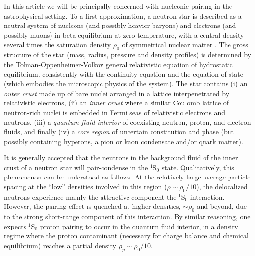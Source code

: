 In this article we will be principally concerned with nucleonic pairing
in the astrophysical setting.  To a first approximation, a neutron star 
is described as a neutral system of nucleons (and possibly heavier baryons) 
and electrons (and possibly muons) in beta equilibrium at zero temperature, 
with a central density several times the saturation density $\rho_0$ 
of symmetrical nuclear matter \cite{pethick,shapiro,lamb,fiks,alparlives}. 
The gross structure of the star (mass, radius, pressure and density 
profiles) is determined by the Tolman-Oppenheimer-Volkov general 
relativistic equation of hydrostatic equilibrium, consistently with 
the continuity equation and the equation of state (which embodies the 
microscopic physics of the system).  The star contains (i) an {\it outer 
crust} made up of bare nuclei arranged in a lattice interpenetrated 
by relativistic electrons, (ii) an {\it inner crust} where a similar 
Coulomb lattice of neutron-rich nuclei is embedded in Fermi seas of 
relativistic electrons and neutrons, (iii) a {\it quantum fluid interior} 
of coexisting neutron, proton, and electron fluids, and finally 
(iv) a {\it core region} of uncertain constitution and phase (but 
possibly containing hyperons, a pion or kaon condensate and/or quark matter).

It is generally accepted \cite{ccdk,ttr} that the neutrons in the 
background fluid of the inner crust of a neutron star will pair-condense 
in the $^1$S$_0$ state.  Qualitatively, this phenomenon can be understood
as follows.  At the relatively large average particle spacing at the 
``low'' densities involved in this region ($\rho \sim \rho_0/10$), 
the delocalized neutrons experience mainly the attractive component 
the $^1$S$_0$ interaction.   However, the pairing effect is quenched 
at higher densities, $\sim \rho_0$ and beyond, due to the strong 
short-range component of this interaction.  By similar reasoning, one 
expects $^1$S$_0$ proton pairing to occur in the quantum fluid interior, 
in a density regime where the proton contaminant (necessary for
charge balance and chemical equilibrium) reaches a partial 
density $\rho_p \sim \rho_0/10$.  

